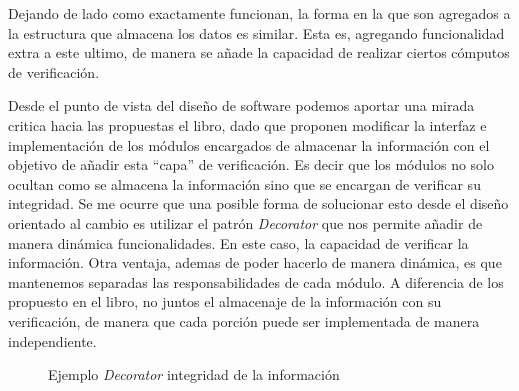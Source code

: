 Dejando de lado como exactamente funcionan, la forma en la que son agregados a la estructura que almacena los datos es similar. Esta es, agregando funcionalidad extra a este ultimo, de manera se añade la capacidad de realizar ciertos cómputos de verificación.

\begin{figure}[h]
\begin{center}
\end{center}
\end{figure}

Desde el punto de vista del diseño de software podemos aportar una mirada critica hacia las propuestas el libro, dado que proponen modificar la interfaz e implementación de los módulos encargados de almacenar la información con el objetivo de añadir esta ``capa'' de verificación. Es decir que los módulos no solo ocultan como se almacena la información sino que se encargan de verificar su integridad. Se me ocurre que una posible forma de solucionar esto desde el diseño orientado al cambio es utilizar el patrón \textit{Decorator} que nos permite añadir de manera dinámica funcionalidades. En este caso, la capacidad de verificar la información. Otra ventaja, ademas de poder hacerlo de manera dinámica, es que mantenemos separadas las responsabilidades de cada módulo. A diferencia de los propuesto en el libro, no juntos el almacenaje de la información con su verificación, de manera que cada porción puede ser implementada de manera independiente.

\begin{figure}[h]
\caption{Ejemplo \textit{Decorator} integridad de la información}
\begin{center}
\end{center}
\end{figure}


